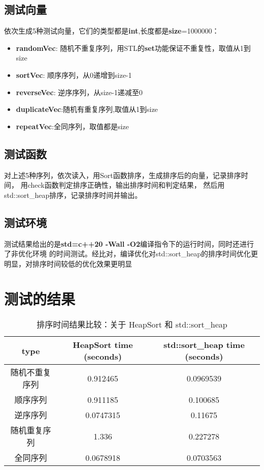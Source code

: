 \documentclass[UTF8]{ctexart}
\begin{document}
\subsection{测试向量}
依次生成5种测试向量，它们的类型都是\textbf{int},长度都是\textbf{size}=1000000：
\begin{itemize}
    \item \textbf{ randomVec}: 随机不重复序列，用STL的\textbf{set}功能保证不重复性，取值从1到size
    \item \textbf{sortVec}: 顺序序列，从0递增到size-1
    \item \textbf{reverseVec}: 逆序序列，从size-1递减至0
    \item \textbf{ duplicateVec}:随机有重复序列,取值从1到size
    \item \textbf{ repeatVec}:全同序列，取值都是size
\end{itemize}
\subsection{测试函数}
对上述5种序列，依次读入，用Sort函数排序，生成排序后的向量，记录排序时间，
用check函数判定排序正确性，输出排序时间和判定结果，
然后用std::sort\_heap排序，记录排序时间并输出。
\subsection{测试环境}
测试结果给出的是\textbf{std=c++20 -Wall -O2}编译指令下的运行时间，同时还进行了非优化环境
的时间测试。经比对，编译优化对std::sort\_heap的排序时间优化更明显，对排序时间较低的优化效果更明显
\section{测试的结果}
\begin{table}[H]
    \centering
    \begin{tabular}{|c|c|c|}
        \hline
        type & HeapSort time (seconds) & std::sort\_heap time (seconds) \\
        \hline
        随机不重复序列 &  0.912465 & 0.0969539 \\
        \hline
        顺序序列 &  0.911185 & 0.100685 \\
        \hline
        逆序序列  & 0.0747315 & 0.11675 \\
        \hline
        随机重复序列 & 1.336 & 0.227278 \\
        \hline
        全同序列 & 0.0678918 & 0.0703563 \\
        \hline
    \end{tabular}
    \caption{排序时间结果比较：关于 HeapSort 和 std::sort\_heap}
    \label{tab:performance}
\end{table}
\end{document}
